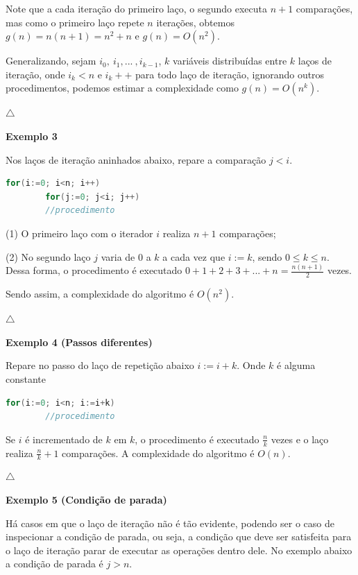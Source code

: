 Note que a cada iteração do primeiro laço, o segundo executa $n+1$ comparações, mas como o primeiro laço repete $n$ iterações, obtemos $g(n)=n(n+1)=n^2+n$ e $g(n)=O(n^2)$.

Generalizando, sejam $i_0, \ i_1, ... \ , i_{k-1}$, $k$ variáveis distribuídas entre $k$ laços de iteração, onde $i_k<n$ e $i_k++$ para todo laço de iteração, ignorando outros procedimentos, podemos estimar a complexidade como $g(n)=O(n^k)$.

{\raggedleft $\bigtriangleup$ \par}

\textbf{Exemplo 3}

Nos laços de iteração aninhados abaixo, repare a comparação $j<i$.

\begin{lstlisting}[language=C, frame=single]
    for(i:=0; i<n; i++)
        for(j:=0; j<i; j++)
        //procedimento
\end{lstlisting}

(1) O primeiro laço com o iterador $i$ realiza $n+1$ comparações;

(2) No segundo laço $j$ varia de $0$ a $k$ a cada vez que $i:=k$, sendo $0\leq k\leq n$. Dessa forma, o procedimento é executado $0+1+2+3+...+n = \frac{n(n+1)}{2}$ vezes.

Sendo assim, a complexidade do algoritmo é $O(n^2)$.

{\raggedleft $\bigtriangleup$ \par}

\textbf{Exemplo 4 (Passos diferentes)}

Repare no passo do laço de repetição abaixo $i:=i+k$. Onde $k$ é alguma constante

\begin{lstlisting}[language=C, frame=single]
    for(i:=0; i<n; i:=i+k)
        //procedimento
\end{lstlisting}

Se $i$ é incrementado de $k$ em $k$, o procedimento é executado $\frac{n}{k}$ vezes e o laço realiza $\frac{n}{k}+1$ comparações. A complexidade do algoritmo é $O(n)$.

{\raggedleft $\bigtriangleup$ \par}

\textbf{Exemplo 5 (Condição de parada)}

Há casos em que o laço de iteração não é tão evidente, podendo ser o caso de inspecionar a condição de parada, ou seja, a condição que deve ser satisfeita para o laço de iteração parar de executar as operações dentro dele. No exemplo abaixo a condição de parada é $j > n$.

